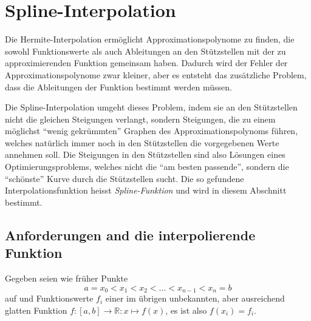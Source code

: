 %
%
%

\section{Spline-Interpolation
\label{buch:section:spline}}
Die Hermite-Interpolation ermöglicht Approximationspolynome zu finden,
die sowohl Funktionswerte als auch Ableitungen an den Stützstellen mit
der zu approximierenden Funktion gemeinsam haben.
Dadurch wird der Fehler der Approximationspolynome zwar kleiner, aber
es entsteht das zusätzliche Problem, dass die Ableitungen der
Funktion bestimmt werden müssen.

Die Spline-Interpolation umgeht dieses Problem, indem sie an den
Stützstellen nicht die gleichen Steigungen verlangt, sondern Steigungen,
die zu einem möglichst ``wenig gekrümmten'' Graphen des Approximationspolynoms
führen,
welches natürlich immer noch in den Stützstellen die vorgegebenen Werte
annehmen soll.
%
Die Steigungen in den Stützstellen sind also Lösungen eines
Optimierungsproblems, welches nicht die ``am besten passende'', sondern
die ``schönste'' Kurve durch die Stützstellen sucht.
%
Die so gefundene Interpolationsfunktion heisst {\em Spline-Funktion}
und wird in diesem Abschnitt bestimmt.
%

%
%
\subsection{Anforderungen and die interpolierende Funktion
\label{buch:subsection:anforderungen}}
Gegeben seien wie früher Punkte
\[
a=x_0< x_1 < x_2< \dots < x_{n-1} < x_n = b
\]
auf und Funktionswerte $f_i$ einer im übrigen unbekannten, aber 
ausreichend glatten Funktion $f\colon [a,b]\to\mathbb R:x\mapsto f(x)$,
es ist also $f(x_i)=f_i$.

